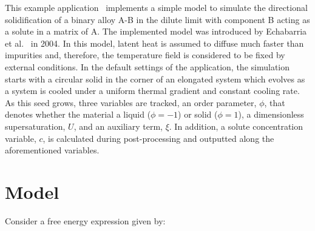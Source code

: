 \documentclass[10pt]{article}
\begin{document}
This example application~\cite{Yao2021} implements a simple model to simulate the directional solidification of a binary alloy A-B in the dilute limit with component B acting as a solute in a matrix of A. The implemented model was introduced by Echabarria et al.~\cite{Echebarria2004} in 2004. In this model, latent heat is assumed to diffuse much faster than impurities and, therefore, the temperature field is considered to be fixed by external conditions. In the default settings of the application, the simulation starts with a circular solid in the corner of an elongated system which evolves as a system is cooled under a uniform thermal gradient and constant cooling rate. As this seed grows, three variables are tracked, an order parameter, $\phi$, that denotes whether the material a liquid ($\phi=-1$) or solid ($\phi=1$), a dimensionless supersaturation, $U$, and an auxiliary term, $\xi$. In addition, a solute concentration variable, $c$, is calculated during post-processing and outputted along the aforementioned variables. 

\section{Model}
Consider a free energy expression given by:
\end{document}
